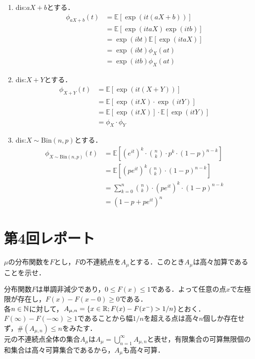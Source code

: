 \documentclass[dvipdfmx, leqno]{jsbook}
\begin{document}
\begin{souanswer}
\begin{enumerate}
    \item dis:$aX+ b$とする．
\begin{align*}
    \phi_{aX+ b}(t)
    &= \mathbb{E}[\exp(it(aX+ b))]\\
    &= \mathbb{E}[\exp(itaX)\exp(itb)]\\
    &= \exp{(ibt)}\mathbb{E}[\exp(itaX)]\\
    &= \exp{(ibt)}\phi_X(at)\\
    &= \exp{(itb)}\phi_X(at)
\end{align*}
    
    \item dis:$X+ Y$とする．
\begin{align*}
    \phi_{X+ Y}(t)
    &= \mathbb{E}[\exp{(it(X+ Y))}]\\
    &= \mathbb{E}[\exp{(itX)}\cdot \exp{(itY)}]\\
    &= \mathbb{E}[\exp{(itX)}]\cdot\mathbb{E}[\exp{(itY)}]\\
    &= \phi_{X}\cdot \phi_{Y}
\end{align*}
    \item dis:$X\sim \mathrm{Bin}(n, p)$とする．
\begin{align*}
    \phi_{X\sim\mathrm{Bin}(n,p)}(t)
    &= \mathbb{E}\left[(e^{it})^k\cdot \binom{n}{k}\cdot p^k\cdot (1- p)^{n- k}\right]\\
    &= \mathbb{E}\left[(pe^{it})^k\binom{n}{k}\cdot (1- p)^{n- k}\right]\\
    &= \sum_{k=0}^{n} \binom{n}{k}\cdot (pe^{it})^k\cdot (1- p)^{n- k}\\
    &= (1- p+ pe^{it})^n
\end{align*}
\end{enumerate}
\end{souanswer}

\section{第4回レポート}
\begin{tcolorbox}
	$\mu$の分布関数を$F$とし，$F$の不連続点を$A_\mu$とする．このとき$A_\mu$は高々加算であることを示せ．
\end{tcolorbox}

\begin{souanswer}
	分布関数$F$は単調非減少であり，$0\le F(x)\le 1$である．よって任意の点$x$で左極限が存在し，$F(x)- F(x- 0)\ge 0$である．\\
	各$n\in \mathbb{N}$に対して，$A_{\mu, n}= \{x\in \mathbb{R}; F(x)- F(x^-)> 1/n\}$とおく．\\
	$F(\infty)- F(-\infty)\ge 1$であることから幅$1/n$を超える点は高々$n$個しか存在せず，$\#(A_{\mu, n})\le n$をみたす．\\
	元の不連続点全体の集合$A_\mu$は$A_\mu= \bigcup_{n= 1}^\infty A_{\mu, n}$と表せ，有限集合の可算無限個の和集合は高々可算集合であるから，$A_\mu$も高々可算．
\end{souanswer}
\end{document}
